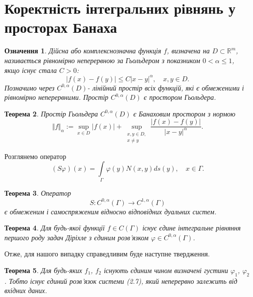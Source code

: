 \documentclass[a4 paper,12pt,ukrainian]{report}
\newtheorem{theorem}{\textbf{Теорема}}[chapter]
\newtheorem{determination}[theorem]{\textbf{Означення}}
\begin{document}
\section{Коректність інтегральних рівнянь у просторах Банаха}
\begin{determination}
Дійсна або комплекснозначна функція $f$, визначена на $D\subset\mathbb{R}^{m}$, називається рівномірно неперервною за Гьольдером з показником $0<\alpha\le 1$, якщо існує стала $C>0$:
\begin{equation*}
|f(x)-f(y)|\le C|x-y|^{\alpha}, \quad x,y\in D.
\end{equation*}
\hspace*{\parindent}Позначимо через $C^{0,\alpha}(D)$- лінійний простір всіх функцій, які є обмеженими і рівномірно неперервними. Простір $C^{0,\alpha}(D)$ є простором Гьольдера.
\end{determination}
\begin{theorem}
Простір Гьольдера $C^{0,\alpha}(D)$ є Банаховим простором з нормою
\begin{equation*}
\Vert f\Vert_{\alpha}:=\sup\limits_{x\in D}|f(x)|+\sup\limits_{\substack{x,y\in D, \\ x\neq y}}\frac{|f(x)-f(y)|}{|x-y|^{\alpha}}.
\end{equation*}
\end{theorem}
\hspace*{\parindent}Розглянемо оператор
\begin{equation*}
(S\varphi)(x)=\int\limits_{\Gamma}{\varphi(y)N(x,y)}ds(y), \quad x\in\Gamma.
\end{equation*}
\begin{theorem}
Оператор
\begin{equation*}
S:C^{0,\alpha}(\Gamma)\to C^{1,\alpha}(\Gamma)
\end{equation*}
є обмеженим і самоспряженим відносно відповідних дуальних систем.
\end{theorem}
\begin{theorem}
Для будь-якої функції $f\in C(\Gamma)$ існує єдине інтегральне рівняння першого роду задач Діріхле з єдиним розв'язком $\varphi\in C^{0,\alpha}(\Gamma)$. 
\end{theorem}
Отже, для нашого випадку справедливим буде наступне твердження.
\begin{theorem}
Для будь-яких $f_{1}$, $f_{2}$ існують єдиним чином визначені густини $\varphi_{1}$, $\varphi_{2}$. Тобто існує єдиний розв'язок системи (2.7), який неперервно залежить від вхідних даних.
\end{theorem}
\end{document}
